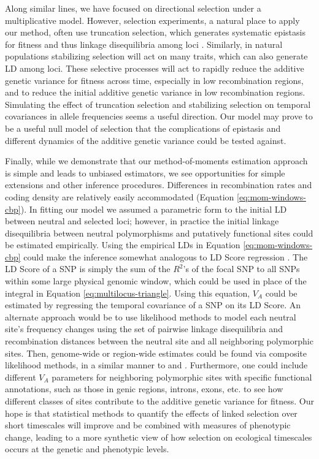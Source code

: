 \documentclass[11pt]{article}
\begin{document}
Along similar lines, we have focused on directional selection under a
multiplicative model. However, selection experiments, a natural place to apply
our method, often use truncation selection, which generates systematic
epistasis for fitness and thus linkage disequilibria among loci
\parencite{Burger2000-an,Walsh2018-bt}. Similarly, in natural populations
stabilizing selection will act on many traits, which can also generate LD among
loci. These selective processes will act to rapidly reduce the additive genetic
variance for fitness across time, especially in low recombination regions, and
to reduce the initial additive genetic variance in low recombination regions.
Simulating the effect of truncation selection and stabilizing selection on
temporal covariances in allele frequencies seems a useful direction. Our model
may prove to be a useful null model of selection that the complications of
epistasis and different dynamics of the additive genetic variance could be
tested against. 

Finally, while we demonstrate that our method-of-moments estimation approach is
simple and leads to unbiased estimators, we see opportunities for simple
extensions and other inference procedures. Differences in recombination rates
and coding density are relatively easily accommodated (Equation
\ref{eq:mom-windows-cbp}). In fitting our model we assumed a parametric form to
the initial LD between neutral and selected loci; however, in practice the
initial linkage disequilibria between neutral polymorphisms and putatively
functional sites could be estimated empirically. Using the empirical LDs in
Equation \eqref{eq:mom-windows-cbp} could make the inference somewhat analogous
to LD Score regression \parencite{Bulik-Sullivan2015-ls}. The LD Score of a SNP
is simply the sum of the $R^2$'s of the focal SNP to all SNPs within some large
physical genomic window, which could be used in place of the integral in
Equation \eqref{eq:multilocus-triangle}. Using this equation, $V_A$ could be
estimated by regressing the temporal covariance of a SNP on its LD Score. An
alternate approach would be to use likelihood methods to model each neutral
site's frequency changes using the set of pairwise linkage disequilibria and
recombination distances between the neutral site and all neighboring
polymorphic sites. Then, genome-wide or region-wide estimates could be found
via composite likelihood methods, in a similar manner to
\textcite{McVicker2009-ax} and \textcite{Elyashiv2016-vt}. Furthermore, one
could include different $V_A$ parameters for neighboring polymorphic sites with
specific functional annotations, such as those in genic regions, introns,
exons, etc. to see how different classes of sites contribute to the additive
genetic variance for fitness. Our hope is that statistical methods to quantify
the effects of linked selection over short timescales will improve and be
combined with measures of phenotypic change, leading to a more synthetic view
of how selection on ecological timescales occurs at the genetic and phenotypic
levels.
\end{document}
